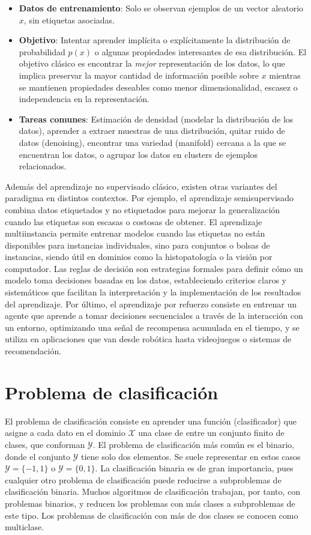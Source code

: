 \begin{itemize}
    \item \textbf{Datos de entrenamiento}: Solo se observan ejemplos de un vector aleatorio $x$, sin etiquetas asociadas.
    \item \textbf{Objetivo}: Intentar aprender implícita o explícitamente la distribución de probabilidad $p(x)$ o algunas propiedades interesantes de esa distribución. El objetivo clásico es encontrar la \emph{mejor} representación de los datos, lo que implica preservar la mayor cantidad de información posible sobre $x$ mientras se mantienen propiedades deseables como menor dimensionalidad, escasez o independencia en la representación.
    \item \textbf{Tareas comunes}: Estimación de densidad (modelar la distribución de los datos), aprender a extraer muestras de una distribución, quitar ruido de datos (denoising), encontrar una variedad (manifold) cercana a la que se encuentran los datos, o agrupar los datos en clusters de ejemplos relacionados.
\end{itemize}

Además del aprendizaje no supervisado clásico, existen otras variantes del paradigma en distintos contextos. Por ejemplo, el aprendizaje semisupervisado combina datos etiquetados y no etiquetados para mejorar la generalización cuando las etiquetas son escasas o costosas de obtener. El aprendizaje multiinstancia permite entrenar modelos cuando las etiquetas no están disponibles para instancias individuales, sino para conjuntos o bolsas de instancias, siendo útil en dominios como la histopatología o la visión por computador. Las reglas de decisión son estrategias formales para definir cómo un modelo toma decisiones basadas en los datos, estableciendo criterios claros y sistemáticos que facilitan la interpretación y la implementación de los resultados del aprendizaje. Por último, el aprendizaje por refuerzo consiste en entrenar un agente que aprende a tomar decisiones secuenciales a través de la interacción con un entorno, optimizando una señal de recompensa acumulada en el tiempo, y se utiliza en aplicaciones que van desde robótica hasta videojuegos o sistemas de recomendación.

\section{Problema de clasificación}
El problema de clasificación consiste en aprender una función (clasificador) que asigne a cada dato en el dominio $\mathcal{X}$ una clase de entre un conjunto finito de clases, que conforman $\mathcal{Y}$. El problema de clasificación más común es el binario, donde el conjunto $\mathcal{Y}$ tiene solo dos elementos. Se suele representar en estos casos $\mathcal{Y} = \{-1,1\}$ o $\mathcal{Y} = \{0,1\}$. La clasificación binaria es de gran importancia, pues cualquier otro problema de clasificación puede reducirse a subproblemas de clasificación binaria. Muchos algoritmos de clasificación trabajan, por tanto, con problemas binarios, y reducen los problemas con más clases a subproblemas de este tipo. Los problemas de clasificación con más de dos clases se conocen como multiclase. 

